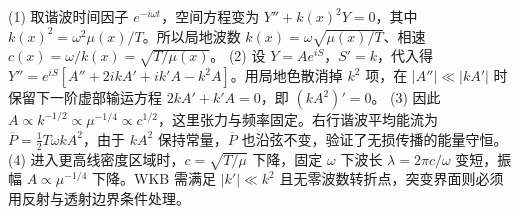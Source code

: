 (1) 取谐波时间因子 \(e^{-i\omega t}\)，空间方程变为 \(Y''+k(x)^2Y=0\)，其中 \(k(x)^2=\omega^2\mu(x)/T\)。所以局地波数 \(k(x)=\omega\sqrt{\mu(x)/T}\)、相速 \(c(x)=\omega/k(x)=\sqrt{T/\mu(x)}\)。
(2) 设 \(Y=Ae^{iS}\)，\(S'=k\)，代入得 \(Y''=e^{iS}[A''+2ikA'+ik'A-k^2A]\)。用局地色散消掉 \(k^2\) 项，在 \(|A''|\ll|kA'|\) 时保留下一阶虚部输运方程 \(2kA'+k'A=0\)，即 \((kA^2)'=0\)。
(3) 因此 \(A\propto k^{-1/2}\propto\mu^{-1/4}\propto c^{1/2}\)，这里张力与频率固定。右行谐波平均能流为 \(\overline P=\frac12 T\omega k A^2\)，由于 \(kA^2\) 保持常量，\(\overline P\) 也沿弦不变，验证了无损传播的能量守恒。
(4) 进入更高线密度区域时，\(c=\sqrt{T/\mu}\) 下降，固定 \(\omega\) 下波长 \(\lambda=2\pi c/\omega\) 变短，振幅 \(A\propto\mu^{-1/4}\) 下降。WKB 需满足 \(|k'|\ll k^2\) 且无零波数转折点，突变界面则必须用反射与透射边界条件处理。
